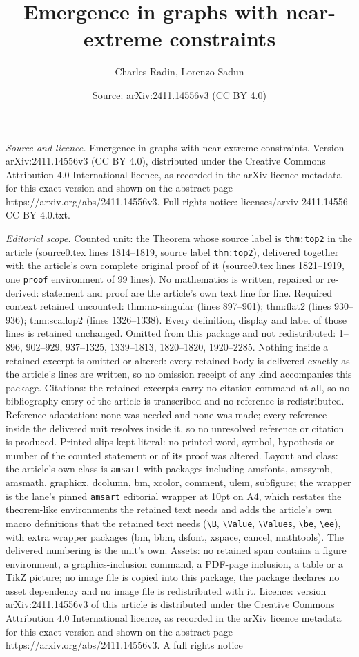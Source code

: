\documentclass[10pt,a4paper]{amsart}
\title[Emergence in graphs with near-extreme constraints]{Emergence in graphs with near-extreme constraints}
\author{Charles Radin, Lorenzo Sadun}
\date{Source: arXiv:2411.14556v3 (CC BY 4.0)}
\begin{document}
\maketitle

\noindent\emph{Source and licence.} Emergence in graphs with near-extreme constraints. Version arXiv:2411.14556v3 (CC BY 4.0), distributed under the Creative Commons Attribution 4.0 International licence, as recorded in the arXiv licence metadata for this exact version and shown on the abstract page https://arxiv.org/abs/2411.14556v3. Full rights notice: licenses/arxiv-2411.14556-CC-BY-4.0.txt.\par\smallskip

\noindent\textit{Editorial scope.} Counted unit: the Theorem whose source label is \texttt{thm:top2} in the article (source0.tex lines 1814--1819, source label \texttt{thm:top2}), delivered together with the article's own complete original proof of it (source0.tex lines 1821--1919, one \texttt{proof} environment of 99 lines). No mathematics is written, repaired or re-derived: statement and proof are the article's own text line for line. Required context retained uncounted: thm:no-singular (lines 897--901); thm:flat2 (lines 930--936); thm:scallop2 (lines 1326--1338). Every definition, display and label of those lines is retained unchanged. Omitted from this package and not redistributed: 1--896, 902--929, 937--1325, 1339--1813, 1820--1820, 1920--2285. Nothing inside a retained excerpt is omitted or altered: every retained body is delivered exactly as the article's lines are written, so no omission receipt of any kind accompanies this package. Citations: the retained excerpts carry no citation command at all, so no bibliography entry of the article is transcribed and no reference is redistributed. Reference adaptation: none was needed and none was made; every reference inside the delivered unit resolves inside it, so no unresolved reference or citation is produced. Printed slips kept literal: no printed word, symbol, hypothesis or number of the counted statement or of its proof was altered. Layout and class: the article's own class is \texttt{amsart} with packages including amsfonts, amssymb, amsmath, graphicx, dcolumn, bm, xcolor, comment, ulem, subfigure; the wrapper is the lane's pinned \texttt{amsart} editorial wrapper at 10pt on A4, which restates the theorem-like environments the retained text needs and adds the article's own macro definitions that the retained text needs (\texttt{\textbackslash B}, \texttt{\textbackslash Value}, \texttt{\textbackslash Values}, \texttt{\textbackslash be}, \texttt{\textbackslash ee}), with extra wrapper packages (bm, bbm, dsfont, xspace, cancel, mathtools). The delivered numbering is the unit's own. Assets: no retained span contains a figure environment, a graphics-inclusion command, a PDF-page inclusion, a table or a TikZ picture; no image file is copied into this package, the package declares no asset dependency and no image file is redistributed with it. Licence: version arXiv:2411.14556v3 of this article is distributed under the Creative Commons Attribution 4.0 International licence, as recorded in the arXiv licence metadata for this exact version and shown on the abstract page https://arxiv.org/abs/2411.14556v3. A full rights notice 
\end{document}

